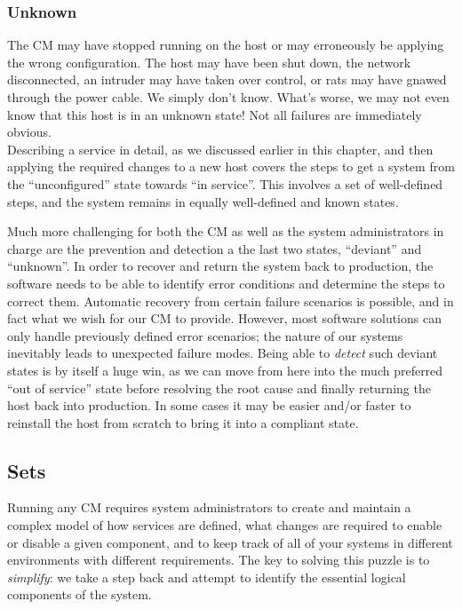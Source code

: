 \subsubsection*{Unknown} The CM may have stopped
running on the host or may erroneously be applying the
wrong configuration.  The host may have been shut
down, the network disconnected, an intruder may have
taken over control, or rats may have gnawed through
the power cable.  We simply don't know.  What's worse,
we may not even know that this host is in an unknown
state!  Not all failures are immediately obvious.  \\

Describing a service in detail, as we discussed
earlier in this chapter, and then applying the
required changes to a new host covers the steps to get
a system from the ``unconfigured'' state towards ``in
service''.  This involves a set of well-defined steps,
and the system remains in equally well-defined and
known states.

Much more challenging for both the CM as well as the
system administrators in charge are the prevention and
detection a the last two states, ``deviant'' and
``unknown''.  In order to recover and return the
system back to production, the software needs to be
able to identify error conditions and determine the
steps to correct them.  Automatic recovery from
certain failure scenarios is possible, and in fact
what we wish for our CM to provide.  However, most
software solutions can only handle previously defined
error scenarios; the nature of our systems inevitably
leads to unexpected failure modes.  Being able to {\em
detect} such deviant states is by itself a huge win,
as we can move from here into the much preferred ``out
of service'' state before resolving the root cause and
finally returning the host back into production.  In
some cases it may be easier and/or faster to reinstall
the host from scratch to bring it into a compliant
state.


\subsection{Sets}
\label{configuration-management:states-sets:sets}

Running any CM requires system administrators to
create and maintain a complex model of how services
are defined, what changes are required to enable or
disable a given component, and to keep track of all of
your systems in different environments with different
requirements.  The key to solving this puzzle is to
{\em simplify}: we take a step back and attempt to
identify the essential logical components of the
system.

